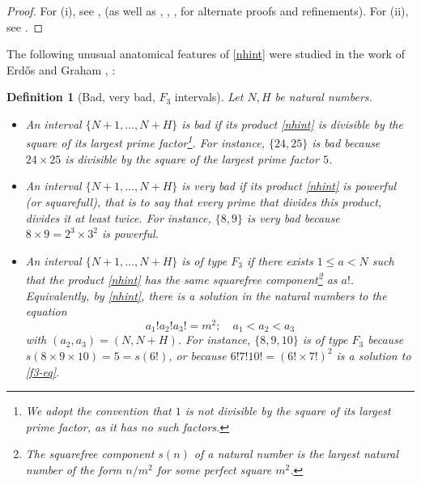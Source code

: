 \documentclass[12pt]{amsart}
\newtheorem{definition}[theorem]{Definition}
\begin{document}
\begin{proof}  For (i), see \cite{sylvester}, \cite{schur} (as well as \cite{erdos-sylvester}, \cite{moser}, \cite{faulkner}, \cite{hanson} for alternate proofs and refinements).  For (ii), see \cite{selfridge}.
\end{proof}

The following unusual anatomical features of \eqref{nhint} were studied in the work of Erd\H{o}s and Graham \cite{erdos-graham}, \cite[p. 70, 71, 73]{eg}:

\begin{definition}[Bad, very bad, $F_3$ intervals]\label{def-bad}  Let $N, H$ be natural numbers.
\begin{itemize}
    \item[(i)] An interval $\{N+1,\dots,N+H\}$ is \emph{bad} if its product \eqref{nhint} is divisible by the square of its largest prime factor\footnote{We adopt the convention that $1$ is not divisible by the square of its largest prime factor, as it has no such factors.}.  For instance, $\{24,25\}$ is bad because $24 \times 25$ is divisible by the square of the largest prime factor $5$.
    \item[(ii)] An interval $\{N+1,\dots,N+H\}$ is \emph{very bad} if its product \eqref{nhint} is \emph{powerful} (or \emph{squarefull}), that is to say that every prime that divides this product, divides it at least twice.  For instance, $\{8,9\}$ is very bad because $8 \times 9 = 2^3 \times 3^2$ is powerful.
    \item[(iii)] An interval $\{N+1,\dots,N+H\}$ is of \emph{type $F_3$} if there exists $1 \leq a < N$ such that the product \eqref{nhint} has the same squarefree component\footnote{The squarefree component $s(n)$ of a natural number is the largest natural number of the form $n/m^2$ for some perfect square $m^2$.} as $a!$.  Equivalently, by \eqref{nhint}, there is a solution in the natural numbers to the equation
\begin{equation}\label{f3-eq}
    a_1! a_2! a_3! = m^2; \quad a_1 < a_2 < a_3
\end{equation}
with $(a_2,a_3)=(N,N+H)$. For instance, $\{8,9,10\}$ is of type $F_3$ because $s(8 \times 9 \times 10) = 5 = s(6!)$, or because $6! 7! 10! = (6!\times 7!)^2$ is a solution to \eqref{f3-eq}.
\end{itemize}
\end{definition}
\end{document}
